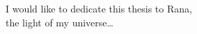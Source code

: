 
\begin{dedication} 

I would like to dedicate this thesis to Rana, \\the light of my universe\dots

\end{dedication}

